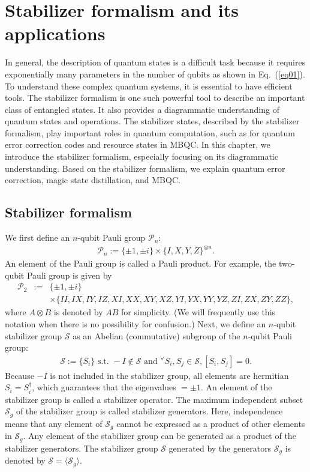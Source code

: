 \chapter{Stabilizer formalism and its applications}
In general, the description of quantum states is a difficult task because it requires exponentially many parameters in the number of qubits as shown in Eq.\ (\ref{eq01}).
To understand these complex quantum systems, it is essential to have efficient tools.
The stabilizer formalism is one such powerful tool to describe an important class of entangled states.
It also provides a diagrammatic understanding of quantum states and operations.
The stabilizer states, described by the stabilizer formalism, play important roles in quantum computation, such as for quantum error correction codes and resource states in MBQC.
In this chapter, we introduce the stabilizer formalism, especially focusing on its diagrammatic understanding.
Based on the stabilizer formalism, we explain quantum error correction, magic state distillation, and MBQC.

\section{Stabilizer formalism}
We first define an $n$-qubit Pauli group $\mathcal{P}_n$:
\begin{eqnarray}
\mathcal{P}_n := \{ \pm 1, \pm i \} \times \{ I, X, Y, Z\}^{\otimes n} .
\end{eqnarray}
An element of the Pauli group is called a Pauli product.
For example, the two-qubit Pauli group is given by
\begin{eqnarray}
\mathcal{P}_2 &:= & \{ \pm 1, \pm i \} 
\nonumber \\
&&\times \{II, IX,IY,IZ,XI,XX,XY,XZ,YI,YX,YY,YZ,ZI,ZX,ZY,ZZ\} ,
\end{eqnarray}
where $A \otimes B$ is denoted by $AB$ for simplicity.
(We will frequently use this notation when there is no possibility for confusion.) 
Next, we define an $n$-qubit stabilizer group $\mathcal{S}$ as an Abelian (commutative) subgroup of the $n$-qubit Pauli group:
\begin{eqnarray}
\mathcal{S}:= \{S_i \} 
\textrm{ s.t.  } 
-I \notin \mathcal{S}
\textrm{ and }
{}^\forall S_i, S_j \in \mathcal{S},
[S_i,S_j]=0.
\end{eqnarray}
Because $-I$ is not included in the stabilizer group, all elements are hermitian $S_i = S_i ^{\dag}$, which guarantees that the eigenvalues $=\pm 1$.
An element of the stabilizer group is called a stabilizer operator.
The maximum independent subset $\mathcal{S}_g$ of 
the stabilizer group is called stabilizer generators.
Here, independence means that any element of $\mathcal{S}_g$ cannot be expressed as a product of other elements in $\mathcal{S}_g$.
Any element of the stabilizer group can be generated as a product of the stabilizer generators.
The stabilizer group $\mathcal{S}$ 
generated by the generators $\mathcal{S}_g$ is denoted by $\mathcal{S} = \langle \mathcal{S}_g \rangle$.

